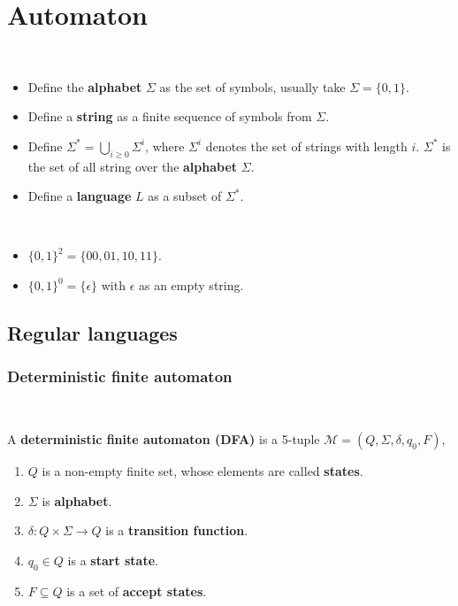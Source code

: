 \setcounter{chapter}{0}
\chapter{Automaton}
\begin{definition} ~
    \begin{itemize}
        \item Define the \textbf{alphabet} $\Sigma$ as the set of symbols, usually take $\Sigma = \{ 0,1 \}$.
        \item Define a \textbf{string} as a finite sequence of symbols from $\Sigma$.
        \item Define $\Sigma^{*} = \bigcup_{i \ge 0} \Sigma^{i}$, where $\Sigma^{i}$ denotes the set of strings with length $i$. $\Sigma^{*}$ is the set of all string over the \textbf{alphabet} $\Sigma$.
        \item Define a \textbf{language} $L$ as a subset of $\Sigma^{*}$.
    \end{itemize}
\end{definition}
\begin{eg} ~
\begin{itemize} 
    \item $\{ 0,1 \}^{2} = \{ 00, 01, 10, 11 \}$.
    \item $\{ 0,1 \}^{0} = \{ \epsilon \}$ with $\epsilon$ as an empty string.
\end{itemize}
\end{eg}

\section{Regular languages} \label{sec:}
\subsection{Deterministic finite automaton} \label{sec:}

\begin{definition} ~ 

A \textbf{deterministic finite automaton (DFA)} is a 5-tuple $\mathcal{M} = (Q, \Sigma, \delta, q_0, F)$,
\begin{enumerate}
    \item $Q$ is a non-empty finite set, whose elements are called \textbf{states}.
    \item $\Sigma$ is \textbf{alphabet}.
    \item $\delta: Q \times \Sigma \to Q$ is a \textbf{transition function}.
    \item $q_0 \in Q$ is a \textbf{start state}.
    \item $F \subseteq Q$ is a set of \textbf{accept states}.
\end{enumerate}
\end{definition}

